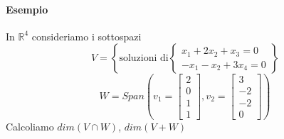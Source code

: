 \documentclass[a4paper, 12pt]{report}
\begin{document}
            \paragraph{Esempio} In $\mathbb{R}^4$ consideriamo i sottospazi
            $$
            V=\left \{
            \text{soluzioni di}
            \begin{cases}
                x_1+2x_2+x_3=0\\
                -x_1-x_2+3x_4=0
            \end{cases}    
            \right \}
            $$
            $$
            W=Span \left (
            v_1=
            \begin{bmatrix}
                2\\
                0\\
                1\\
                1
            \end{bmatrix}
            ,v_2=
            \begin{bmatrix}
                3\\
                -2\\
                -2\\ 
                0
            \end{bmatrix}
            \right )
            $$
            Calcoliamo $dim(V \cap W )$, $dim(V+W)$
\end{document}
